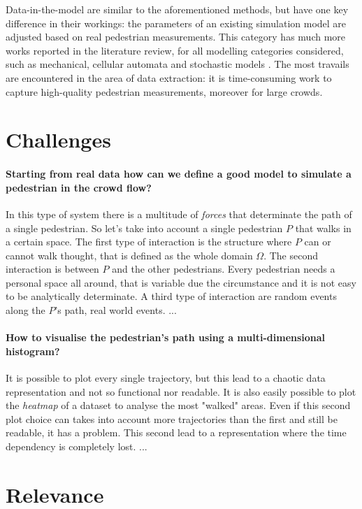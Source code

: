 \documentclass[class=article, crop=false]{standalone}
\begin{document}
Data-in-the-model are similar to the aforementioned methods, but have one key difference in their workings: the parameters of an existing simulation model are adjusted based on real pedestrian measurements. This category has much more works reported in the literature review, for all modelling categories considered, such as mechanical, cellular automata and stochastic models \cite{crowd_simulation,interactive_crowd_simulation,data_driven_simulation}. The most travails are encountered in the area of data extraction: it is time-consuming work to capture high-quality pedestrian measurements, moreover for large crowds.



\section{Challenges}

\paragraph{Starting from real data how can we define a good model to simulate a pedestrian in the crowd flow?}
In this type of system there is a multitude of \emph{forces} that determinate the path of a single pedestrian.
So let's take into account a single pedestrian $P$ that walks in a certain space.
The first type of interaction is the structure where $P$ can or cannot walk thought, that is defined as the whole domain $\Omega$.
The second interaction is between $P$ and the other pedestrians.
Every pedestrian needs a personal space all around, that is variable due the circumstance and it is not easy to be analytically determinate.
A third type of interaction are random events along the $P$'s path, real world events.
...

\paragraph{How to visualise the pedestrian's path using a multi-dimensional histogram?}
It is possible to plot every single trajectory, but this lead to a chaotic data representation and not so functional nor readable.
It is also easily possible to plot the \emph{heatmap} of a dataset to analyse the most "walked" areas.
Even if this second plot choice can takes into account more trajectories than the first and still be readable, it has a problem.
This second lead to a representation where the time dependency is completely lost.
...





\section{Relevance}
\end{document}
